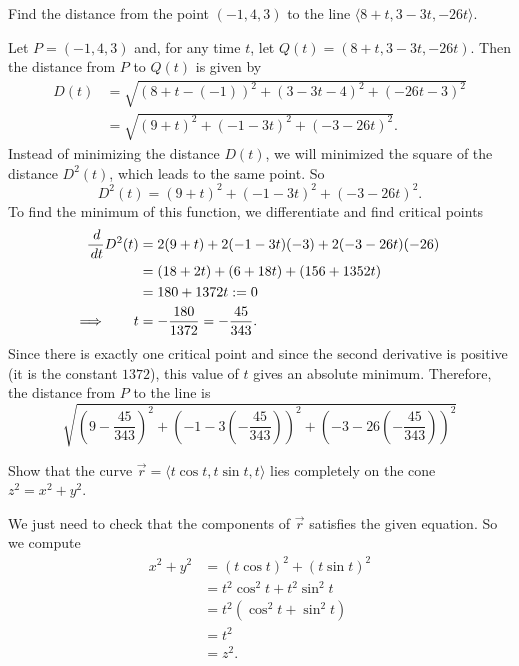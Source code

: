 \documentclass[]{ximera}
\begin{document}
\begin{problem}
Find the distance from the point $(-1,4,3)$ to the line $\langle 8+t,3-3t,-26t \rangle$.  
	\begin{freeResponse}
	Let $P = (-1,4,3)$ and, for any time $t$, let $Q(t) = (8+t,3-3t,-26t)$.  
	Then the distance from $P$ to $Q(t)$ is given by
		\begin{align*}
		D(t) &=
		\sqrt{(8+t - (-1))^2 + (3-3t -4)^2 + (-26t-3)^2}  \\
		&= \sqrt{(9+t)^2 + (-1-3t)^2 + (-3-26t)^2}.
		\end{align*}
	Instead of minimizing the distance $D(t)$, we will minimized the square of the distance $D^2(t)$, which leads to the same point.  
	So
		\[
		D^2(t) = (9+t)^2 + (-1-3t)^2 + (-3-26t)^2.
		\]
	To find the minimum of this function, we differentiate and find critical points
		\begin{align*}
		\frac{\,d}{\,d t} D^2(t) &= 2(9+t) + 2(-1-3t)(-3) + 2(-3-26t)(-26)  \\
		&= (18 + 2t) + (6 + 18t) + (156 + 1352t)  \\
		&= 180 + 1372t := 0  \\
		\Longrightarrow \qquad t &= - \frac{180}{1372} = - \frac{45}{343}.
		\end{align*}
	Since there is exactly one critical point and since the second derivative is positive (it is the constant $1372$), this value of $t$ gives an absolute minimum.
	Therefore, the distance from $P$ to the line is
		\[
		\boxed{\sqrt{\left( 9-\frac{45}{343} \right)^2 + \left(-1-3\left( - \frac{45}{343} \right) \right)^2 + \left(-3-26\left( - \frac{45}{343} \right) \right)^2}}
		\]
	\end{freeResponse}
		
\end{problem}

\begin{instructorNotes}

\end{instructorNotes}







\begin{problem}
Show that the curve $\vec{r} = \langle t \cos t, t \sin t, t \rangle$ lies completely on the cone $z^2 = x^2 + y^2$.  
	\begin{freeResponse}
	We just need to check that the components of $\vec{r}$ satisfies the given equation.  
	So we compute
		\begin{align*}
		x^2 + y^2 &= (t \cos t)^2 + (t \sin t)^2  \\
		&= t^2 \cos^2 t + t^2 \sin^2 t  \\
		&= t^2 (\cos^2 t + \sin^2 t)  \\
		&= t^2  \\
		&= z^2.
		\end{align*}
	\end{freeResponse}

\end{problem}
\end{document}
